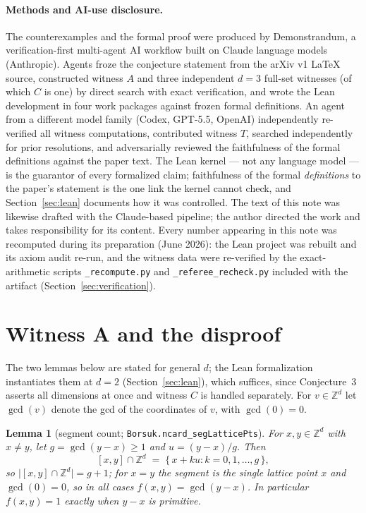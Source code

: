 \documentclass[11pt]{article}
\newtheorem{lemma}[theorem]{Lemma}
\theoremstyle{remark}
\newcommand{\Z}{\mathbb{Z}}
\begin{document}
\paragraph{Methods and AI-use disclosure.}
The counterexamples and the formal proof were produced by Demonstrandum, a
verification-first multi-agent AI workflow built on Claude language models
(Anthropic). Agents froze the
conjecture statement from the arXiv v1 \LaTeX{} source, constructed witness
$A$ and three independent $d=3$ full-set witnesses (of which $C$ is one) by
direct search with exact verification, and wrote the Lean development in four
work packages against frozen formal definitions. An agent from a different
model family (Codex, GPT-5.5, OpenAI) independently re-verified all witness
computations, contributed witness $T$, searched independently for prior
resolutions, and adversarially reviewed the faithfulness of the formal
definitions against the paper text. The Lean kernel --- not any language
model --- is the guarantor of every formalized claim; faithfulness of the
formal \emph{definitions} to the paper's statement is the one link the kernel
cannot check, and Section~\ref{sec:lean} documents how it was controlled.
The text of this note was likewise drafted with the Claude-based pipeline;
the author directed the work and takes responsibility for its content. Every
number appearing in this note was recomputed during its preparation (June
2026): the Lean project was rebuilt and its axiom audit re-run, and the
witness data were re-verified by the exact-arithmetic scripts
\texttt{\_recompute.py} and \texttt{\_referee\_recheck.py} included with the
artifact (Section~\ref{sec:verification}).

\section{Witness A and the disproof}\label{sec:witnessA}

The two lemmas below are stated for general $d$; the Lean formalization
instantiates them at $d = 2$ (Section~\ref{sec:lean}), which suffices, since
Conjecture~3 asserts all dimensions at once and witness $C$ is handled
separately. For $v \in \Z^d$ let $\gcd(v)$ denote the gcd of the coordinates
of $v$, with $\gcd(0) = 0$.

\begin{lemma}[segment count; \texttt{Borsuk.ncard\_segLatticePts}]
\label{lem:gcd}
For $x, y \in \Z^d$ with $x \neq y$, let $g = \gcd(y - x) \ge 1$ and
$u = (y-x)/g$. Then
\[
[x,y] \cap \Z^d \;=\; \{\, x + k u : k = 0, 1, \dots, g \,\},
\]
so $\bigl|[x,y] \cap \Z^d\bigr| = g + 1$; for $x = y$ the segment is the
single lattice point $x$ and $\gcd(0) = 0$, so in all cases
$f(x,y) = \gcd(y - x)$. In particular $f(x,y) = 1$ exactly when $y - x$ is
primitive.
\end{lemma}
\end{document}
